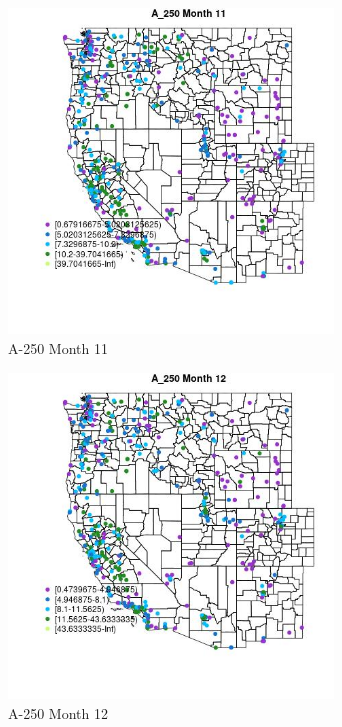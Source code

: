 \begin{figure} 
\centering  
\includegraphics[width=0.77\textwidth]{Code_Outputs/ML_input_report_ML_input_PM25_Step5_part_d_de_duplicated_aves_ML_input_MapObsMo11A_250.jpg} 
\caption{\label{fig:ML_input_report_ML_input_PM25_Step5_part_d_de_duplicated_aves_ML_inputMapObsMo11A_250}A-250 Month 11} 
\end{figure} 
 

\clearpage 

\begin{figure} 
\centering  
\includegraphics[width=0.77\textwidth]{Code_Outputs/ML_input_report_ML_input_PM25_Step5_part_d_de_duplicated_aves_ML_input_MapObsMo12A_250.jpg} 
\caption{\label{fig:ML_input_report_ML_input_PM25_Step5_part_d_de_duplicated_aves_ML_inputMapObsMo12A_250}A-250 Month 12} 
\end{figure} 
 

